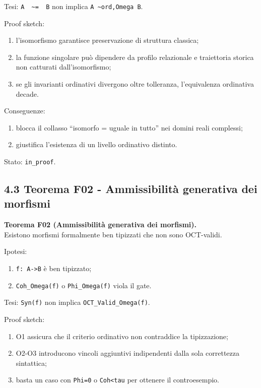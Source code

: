 Tesi:
\texttt{A\ \ \textasciitilde{}=\ \ B} non implica \texttt{A\ \textasciitilde{}ord,Omega\ B}.

Proof sketch:

\begin{enumerate}
\def\labelenumi{\arabic{enumi}.}
\tightlist
\item
  l'isomorfismo garantisce preservazione di struttura classica;
\item
  la funzione singolare può dipendere da profilo relazionale e traiettoria storica non catturati dall'isomorfismo;
\item
  se gli invarianti ordinativi divergono oltre tolleranza, l'equivalenza ordinativa decade.
\end{enumerate}

Conseguenze:

\begin{enumerate}
\def\labelenumi{\arabic{enumi}.}
\tightlist
\item
  blocca il collasso ``isomorfo = uguale in tutto'' nei domini reali complessi;
\item
  giustifica l'esistenza di un livello ordinativo distinto.
\end{enumerate}

Stato: \texttt{in\_proof}.

\subsection{4.3 Teorema F02 - Ammissibilità generativa dei morfismi}

\textbf{Teorema F02 (Ammissibilità generativa dei morfismi).}\\
Esistono morfismi formalmente ben tipizzati che non sono OCT-validi.

Ipotesi:

\begin{enumerate}
\def\labelenumi{\arabic{enumi}.}
\tightlist
\item
  \texttt{f:\ A-\textgreater{}B} è ben tipizzato;
\item
  \texttt{Coh\_Omega(f)} o \texttt{Phi\_Omega(f)} viola il gate.
\end{enumerate}

Tesi:
\texttt{Syn(f)} non implica \texttt{OCT\_Valid\_Omega(f)}.

Proof sketch:

\begin{enumerate}
\def\labelenumi{\arabic{enumi}.}
\tightlist
\item
  O1 assicura che il criterio ordinativo non contraddice la tipizzazione;
\item
  O2-O3 introducono vincoli aggiuntivi indipendenti dalla sola correttezza sintattica;
\item
  basta un caso con \texttt{Phi=0} o \texttt{Coh\textless{}tau} per ottenere il controesempio.
\end{enumerate}

